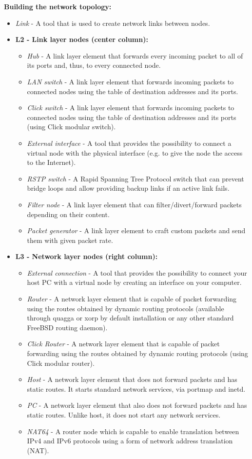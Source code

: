   \textbf{Building the network topology:} \hfill
  \begin{itemize}
  \item \emph{Link} - A tool that is used to create network links between nodes.
  \item \textbf{L2 - Link layer nodes (center column):} \hfill
  \begin{itemize}
  \item \emph{Hub} - A link layer element that forwards every incoming packet to all of its ports and, thus, to every connected node.
  \item \emph{LAN switch} - A link layer element that forwards incoming packets to connected nodes using the table of destination addresses and its ports.
  \item \emph{Click switch} - A link layer element that forwards incoming packets to connected nodes using the table of destination addresses and its ports (using Click modular switch).
  \item \emph{External interface} - A tool that provides the possibility to connect a virtual node with the physical interface (e.g. to give the node the access to the Internet).
  \item \emph{RSTP switch} - A Rapid Spanning Tree Protocol switch that can prevent bridge loops and allow providing backup links if an active link fails.
  \item \emph{Filter node} - A link layer element that can filter/divert/forward packets depending on their content.
  \item \emph{Packet generator} - A link layer element to craft custom packets and send them with given packet rate.
  \end{itemize}
  \item \textbf{L3 - Network layer nodes (right column):} \hfill
  \begin{itemize}
  \item \emph{External connection} - A tool that provides the possibility to connect your host PC with a virtual node by creating an interface on your computer.
  \item \emph{Router} - A network layer element that is capable of packet forwarding using the routes obtained by dynamic routing protocols (available through quagga or xorp by default installation or any other standard FreeBSD routing daemon).
  \item \emph{Click Router} - A network layer element that is capable of packet forwarding using the routes obtained by dynamic routing protocols (using Click modular router).
  \item \emph{Host} - A network layer element that does not forward packets and has static routes. It starts standard network services, via portmap and inetd.
  \item \emph{PC} - A network layer element that also does not forward packets and has static routes. Unlike host, it does not start any network services.
  \item \emph{NAT64} - A router node which is capable to enable translation between IPv4 and IPv6 protocols using a form of network address translation (NAT).
  \end{itemize}
  \end{itemize}


